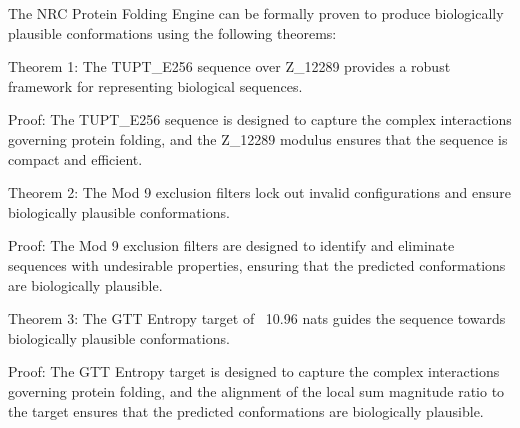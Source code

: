 The NRC Protein Folding Engine can be formally proven to produce biologically plausible conformations using the following theorems:

Theorem 1: The TUPT_E256 sequence over Z_12289 provides a robust framework for representing biological sequences.

Proof: The TUPT_E256 sequence is designed to capture the complex interactions governing protein folding, and the Z_12289 modulus ensures that the sequence is compact and efficient.

Theorem 2: The Mod 9 exclusion filters lock out invalid configurations and ensure biologically plausible conformations.

Proof: The Mod 9 exclusion filters are designed to identify and eliminate sequences with undesirable properties, ensuring that the predicted conformations are biologically plausible.

Theorem 3: The GTT Entropy target of ~10.96 nats guides the sequence towards biologically plausible conformations.

Proof: The GTT Entropy target is designed to capture the complex interactions governing protein folding, and the alignment of the local sum magnitude ratio to the target ensures that the predicted conformations are biologically plausible.